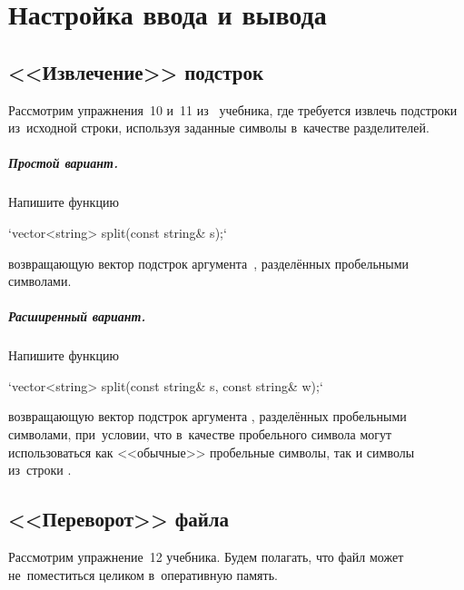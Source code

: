 
\chapter{Настройка ввода и вывода}

\section{<<Извлечение>> подстрок}
Рассмотрим упражнения~10 и~11 из~ учебника, где требуется извлечь подстроки из~исходной строки, используя заданные символы в~качестве разделителей.



\paragraph{Простой вариант.}
Напишите функцию

\cpp`vector<string> split(const string& s);`

\noindent возвращающую вектор подстрок аргумента~, разделённых пробельными символами.



\paragraph{Расширенный вариант.}
Напишите функцию

\cpp`vector<string> split(const string& s, const string& w);`

\noindent возвращающую вектор подстрок аргумента , разделённых пробельными символами, при~условии, что в~качестве пробельного символа могут использоваться как <<обычные>> пробельные символы, так и символы из~строки .



\section{<<Переворот>> файла}
Рассмотрим упражнение~12  учебника. Будем полагать, что файл может не~поместиться целиком в~оперативную память.

